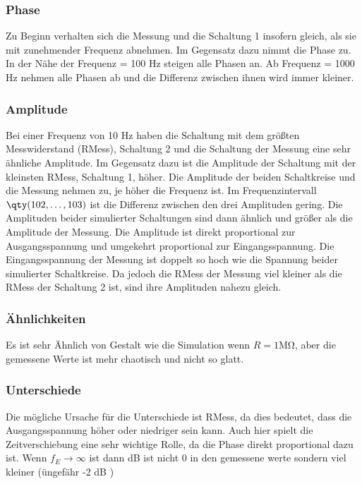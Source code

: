 %
%
\subsubsection{Phase}
Zu Beginn verhalten sich die Messung und die Schaltung 1 insofern gleich, als sie mit zunehmender Frequenz abnehmen. Im Gegensatz dazu nimmt die Phase zu. In der Nähe der Frequenz = 100 Hz steigen alle Phasen an. Ab Frequenz = 1000 Hz nehmen alle Phasen ab und die Differenz zwischen ihnen wird immer kleiner.

\subsubsection{Amplitude}
Bei einer Frequenz von 10 Hz haben die Schaltung mit dem größten Messwiderstand (RMess), Schaltung 2 und die Schaltung der Messung eine sehr ähnliche Amplitude. Im Gegensatz dazu ist die Amplitude der Schaltung mit der kleinsten RMess, Schaltung 1, höher. Die Amplitude der beiden Schaltkreise und die Messung nehmen zu, je höher die Frequenz ist. Im Frequenzintervall $\qty(102,\dots,103)$ ist die Differenz zwischen den drei Amplituden gering. Die Amplituden beider simulierter Schaltungen sind dann ähnlich und größer als die Amplitude der Messung. Die Amplitude ist direkt proportional zur Ausgangsspannung und umgekehrt proportional zur Eingangsspannung. Die Eingangsspannung der Messung ist doppelt so hoch wie die Spannung beider simulierter Schaltkreise. Da jedoch die RMess der Messung viel kleiner als die RMess der Schaltung 2 ist, sind ihre Amplituden nahezu gleich.

\subsubsection{Ähnlichkeiten}
Es ist sehr Ähnlich von Gestalt wie die Simulation wenn $R=1 \si{\mega\ohm}$, aber die gemessene Werte ist mehr chaotisch und nicht so glatt. 


\subsubsection{Unterschiede}
Die mögliche Ursache für die Unterschiede ist RMess, da dies bedeutet, dass die Ausgangsspannung höher oder niedriger sein kann. Auch hier spielt die Zeitverschiebung eine sehr wichtige Rolle, da die Phase direkt proportional dazu ist. Wenn 
$f_E\rightarrow\infty$ ist dann dB ist nicht 0 in den gemessene werte sondern viel kleiner (üngefähr -2 dB  )
%
%
%
\begin{flushright}
  \textit{\autorA}
\end{flushright}
%
%
%
%
